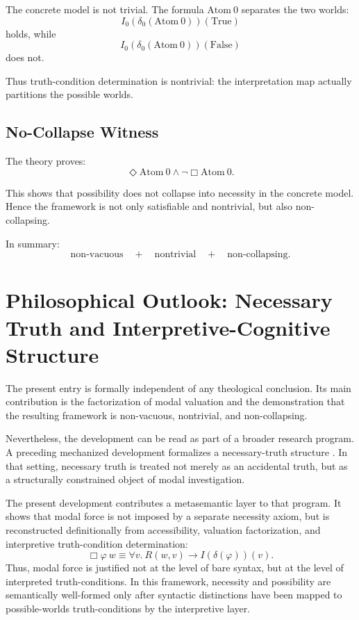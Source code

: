 \documentclass[11pt,a4paper]{article}
\begin{document}
The concrete model is not trivial. The formula $\mathrm{Atom}\ 0$ separates the two worlds:
\[
I_0(\delta_0(\mathrm{Atom}\ 0))(\mathrm{True})
\]
holds, while
\[
I_0(\delta_0(\mathrm{Atom}\ 0))(\mathrm{False})
\]
does not.

Thus truth-condition determination is nontrivial: the interpretation map actually partitions the possible worlds.

\subsection{No-Collapse Witness}

The theory proves:
\[
\Diamond \mathrm{Atom}\ 0 \wedge \neg \Box \mathrm{Atom}\ 0.
\]

This shows that possibility does not collapse into necessity in the concrete model. Hence the framework is not only satisfiable and nontrivial, but also non-collapsing.

In summary:
\[
\text{non-vacuous}
\quad+\quad
\text{nontrivial}
\quad+\quad
\text{non-collapsing}.
\]

\section{Philosophical Outlook: Necessary Truth and Interpretive-Cognitive Structure}

The present entry is formally independent of any theological conclusion. Its main contribution is the factorization of modal valuation and the demonstration that the resulting framework is non-vacuous, nontrivial, and non-collapsing.

Nevertheless, the development can be read as part of a broader research program. A preceding mechanized development formalizes a necessary-truth structure \cite{Kim2026AxiomFreeTrinity}. In that setting, necessary truth is treated not merely as an accidental truth, but as a structurally constrained object of modal investigation.

The present development contributes a metasemantic layer to that program. It shows that modal force is not imposed by a separate necessity axiom, but is reconstructed definitionally from accessibility, valuation factorization, and interpretive truth-condition determination:
\[
\Box \varphi\ w
\equiv
\forall v.\ R(w,v) \longrightarrow I(\delta(\varphi))(v).
\]
Thus, modal force is justified not at the level of bare syntax, but at the level of interpreted truth-conditions. In this framework, necessity and possibility are semantically well-formed only after syntactic distinctions have been mapped to possible-worlds truth-conditions by the interpretive layer.
\end{document}
